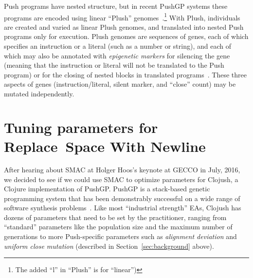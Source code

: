 Push programs have nested structure, but in recent PushGP systems these 
programs are encoded using linear ``Plush'' 
genomes~\cite{helmuthlinear}.\footnote{The added ``l'' in ``Plush'' 
	is for ``linear'')}
With Plush, individuals are created and varied as linear Plush genomes, and 
translated into nested Push programs only for execution.
Plush genomes are sequences of genes, each of which specifies an instruction or 
a literal (such as a number or string), and each of which may also be annotated 
with {\it epigenetic markers} for silencing the gene (meaning that the instruction 
or literal will not be translated to the Push program) or for the closing of nested 
blocks in translated programs~\cite{la2015inheritable}. These three aspects of 
genes (instruction/literal, silent marker, and ``close'' count) may be mutated 
independently.


\section{Tuning parameters for Replace~Space With Newline}
\label{sec:tuningRSWN}



After hearing about SMAC at Holger Hoos's keynote at GECCO in July, 2016, we
decided to see if we could use SMAC to optimize parameters for Clojush, a
Clojure implementation of PushGP. PushGP is a stack-based genetic programming
system that has been demonstrably successful on a wide range of software
synthesis problems~\cite{Helmuth:2015:GECCO}. Like most ``industrial
strength'' EAs, Clojush has dozens of parameters that need to be set by the
practitioner, ranging from ``standard'' parameters like the population size
and the maximum number of generations to more Push-specific parameters
such as \emph{alignment deviation} and \emph{uniform close mutation} (described
in Section~\ref{sec:background} above).

